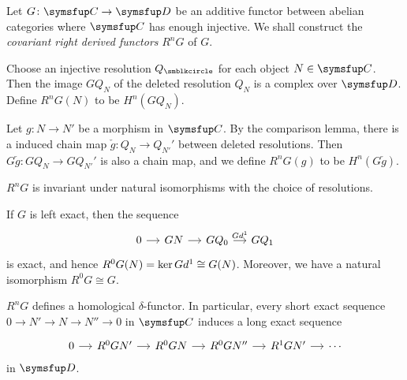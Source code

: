 \begin{definition}
  Let $G\colon \CAT{C}\to \CAT{D}$ be an additive functor between abelian categories where $\CAT{C}$ has enough injective. We shall construct the \emph{covariant right derived functors} $R^nG$ of $G$.

  Choose an injective resolution $Q_\CCCIR$ for each object $N\in\CAT{C}$. Then the image $GQ_N$ of the deleted resolution $Q_N$ is a complex over $\CAT{D}$. Define $R^nG(N)$ to be $H^n(GQ_N)$.

  Let $g\colon N\to N'$ be a morphism in $\CAT{C}$. By the comparison lemma, there is a induced chain map $\check g\colon Q_N\to Q_{N'}'$ between deleted resolutions. Then $G\check g\colon GQ_N\to GQ_{N'}'$ is also a chain map, and we define $R^nG(g)$ to be $H^n(G\check g)$.
\end{definition}

\begin{remark}
  $R^nG$ is invariant under natural isomorphisms with the choice of resolutions.
\end{remark}

\begin{remark}
  If $G$ is left exact, then the sequence
  \begin{equation*}
    \begin{tikzcd}[sep=small]
      0 & GN & GQ_0 & GQ_1
      \arrow[from=1-1,]{1-2}[]{}
      \arrow[from=1-2,]{1-3}[]{}
      \arrow[from=1-3,]{1-4}[]{Gd^1}
    \end{tikzcd}
  \end{equation*}
  is exact, and hence $R^0G(N)=\operatorname{ker} Gd^1 \cong G(N)$. Moreover, we have a natural isomorphism $R^0G\cong G$.
\end{remark}

\begin{proposition}
  $R^nG$ defines a homological $\delta$-functor. In particular, every short exact sequence $0\to N'\to N\to N''\to 0$ in $\CAT{C}$ induces a long exact sequence
  \begin{equation*}
    \begin{tikzcd}[sep=small]
      0 & R^0GN' & R^0GN & R^0GN'' & R^1GN' & \dotsb
      \arrow[from=1-1,]{1-2}[]{}
      \arrow[from=1-2,]{1-3}[]{}
      \arrow[from=1-3,]{1-4}[]{}
      \arrow[from=1-4,]{1-5}[]{}
      \arrow[from=1-5,]{1-6}[]{}
    \end{tikzcd}
  \end{equation*}
  in $\CAT{D}$.
\end{proposition}

